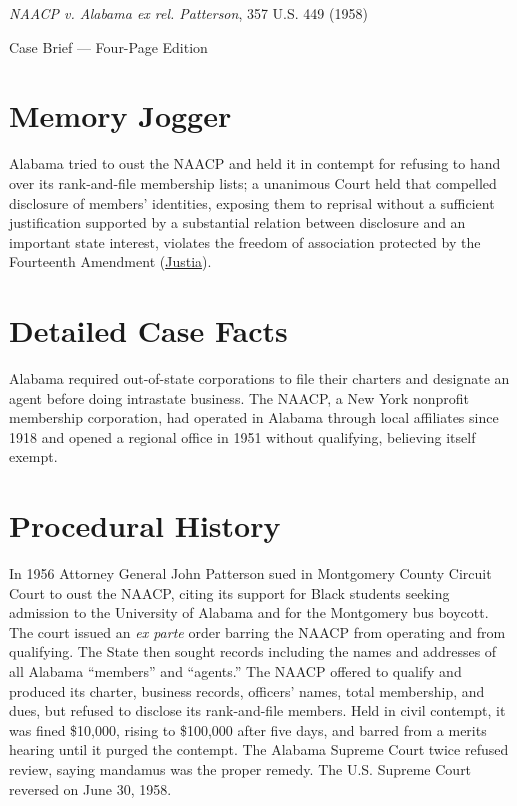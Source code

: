 \documentclass[12pt]{article}
\begin{document}
\begin{center}
{\LARGE \textit{NAACP v. Alabama ex rel. Patterson}, 357 U.S. 449 (1958)\par}
\vspace{0.8em}
{\large Case Brief --- Four-Page Edition\par}
\end{center}
\vspace{1em}

\section{Memory Jogger}

Alabama tried to oust the NAACP and held it in contempt for refusing to hand over its rank-and-file membership lists; a unanimous Court held that compelled disclosure of members' identities, exposing them to reprisal without a sufficient justification supported by a substantial relation between disclosure and an important state interest, violates the freedom of association protected by the Fourteenth Amendment (\href{https://supreme.justia.com/cases/federal/us/357/449/}{Justia}).

\section{Detailed Case Facts}

Alabama required out-of-state corporations to file their charters and designate an agent before doing intrastate business. The NAACP, a New York nonprofit membership corporation, had operated in Alabama through local affiliates since 1918 and opened a regional office in 1951 without qualifying, believing itself exempt.

\section{Procedural History}

In 1956 Attorney General John Patterson sued in Montgomery County Circuit Court to oust the NAACP, citing its support for Black students seeking admission to the University of Alabama and for the Montgomery bus boycott. The court issued an \textit{ex parte} order barring the NAACP from operating and from qualifying. The State then sought records including the names and addresses of all Alabama ``members'' and ``agents.'' The NAACP offered to qualify and produced its charter, business records, officers' names, total membership, and dues, but refused to disclose its rank-and-file members. Held in civil contempt, it was fined \$10,000, rising to \$100,000 after five days, and barred from a merits hearing until it purged the contempt. The Alabama Supreme Court twice refused review, saying mandamus was the proper remedy. The U.S. Supreme Court reversed on June 30, 1958.
\end{document}

